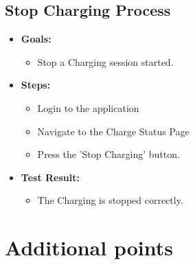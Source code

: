 \documentclass{Configuration_Files/PoliMi3i_thesis}
\begin{document}
\subsection{Stop Charging Process}
\begin{itemize}
    \item\textbf{Goals:}
        \begin{itemize}
            \item Stop a Charging session started. 
       \end{itemize}
    \item \textbf{Steps:}
        \begin{itemize}
            \item Login to the application  
            \item Navigate to the Charge Status Page 
             \item Press the 'Stop Charging' button. 
        \end{itemize}         
    \item\textbf{Test Result:}
        \begin{itemize}
            \item The Charging is stopped correctly.
    \end{itemize}
\end{itemize}



\section{Additional points}
\end{document}
